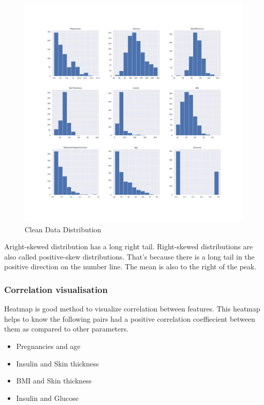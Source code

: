 \documentclass[
]{article}
\providecommand{\tightlist}{%
  \setlength{\itemsep}{0pt}\setlength{\parskip}{0pt}}
\begin{document}
\begin{figure}
\centering
\includegraphics{clean.jpg}
\caption{Clean Data Distribution}
\end{figure}

Aright-skewed distribution has a long right tail. Right-skewed
distributions are also called positive-skew distributions. That's
because there is a long tail in the positive direction on the number
line. The mean is also to the right of the peak.

\hypertarget{correlation-visualisation}{%
\subsubsection{Correlation
visualisation}\label{correlation-visualisation}}

Heatmap is good method to visualize correlation between features. This
heatmap helps to know the following pairs had a positive correlation
coeffiecient between them as compared to other parameters.

\begin{itemize}
\tightlist
\item
  Pregnancies and age
\item
  Insulin and Skin thickness
\item
  BMI and Skin thickness
\item
  Insulin and Glucose
\end{itemize}
\end{document}
